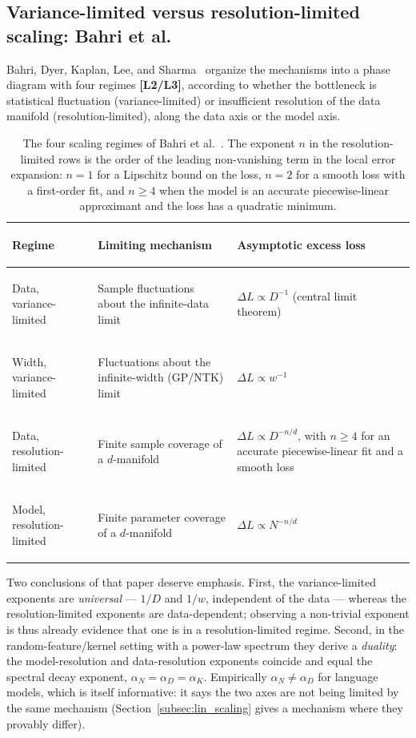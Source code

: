 \documentclass[11pt,a4paper]{article}
\theoremstyle{definition}
\begin{document}
\subsection{Variance-limited versus resolution-limited scaling: Bahri et al.}
\label{subsec:bahri_pnas}

Bahri, Dyer, Kaplan, Lee, and Sharma~\cite{bahri2024explaining} organize the mechanisms into a phase diagram with four regimes \textbf{[L2/L3]}, according to whether the bottleneck is statistical fluctuation (variance-limited) or insufficient resolution of the data manifold (resolution-limited), along the data axis or the model axis.

\begin{table}[htbp]
\centering
\small
\renewcommand{\arraystretch}{1.3}
\begin{tabularx}{\textwidth}{>{\bfseries\raggedright\arraybackslash}p{3.0cm} >{\raggedright\arraybackslash}p{4.4cm} >{\raggedright\arraybackslash}X}
\toprule
\textbf{Regime} & \textbf{Limiting mechanism} & \textbf{Asymptotic excess loss} \\
\midrule
Data, variance-limited & Sample fluctuations about the infinite-data limit & $\Delta L \propto D^{-1}$ (central limit theorem) \\
Width, variance-limited & Fluctuations about the infinite-width (GP/NTK) limit & $\Delta L \propto w^{-1}$ \\
Data, resolution-limited & Finite sample coverage of a $d$-manifold & $\Delta L \propto D^{-n/d}$, with $n \ge 4$ for an accurate piecewise-linear fit and a smooth loss \\
Model, resolution-limited & Finite parameter coverage of a $d$-manifold & $\Delta L \propto N^{-n/d}$ \\
\bottomrule
\end{tabularx}
\caption{The four scaling regimes of Bahri et al.~\cite{bahri2024explaining}. The exponent $n$ in the resolution-limited rows is the order of the leading non-vanishing term in the local error expansion: $n=1$ for a Lipschitz bound on the loss, $n=2$ for a smooth loss with a first-order fit, and $n\ge 4$ when the model is an accurate piecewise-linear approximant and the loss has a quadratic minimum.}
\label{tab:bahri_regimes}
\end{table}

Two conclusions of that paper deserve emphasis. First, the variance-limited exponents are \emph{universal} --- $1/D$ and $1/w$, independent of the data --- whereas the resolution-limited exponents are data-dependent; observing a non-trivial exponent is thus already evidence that one is in a resolution-limited regime. Second, in the random-feature/kernel setting with a power-law spectrum they derive a \emph{duality}: the model-resolution and data-resolution exponents coincide and equal the spectral decay exponent, $\alpha_N=\alpha_D=\alpha_K$. Empirically $\alpha_N\ne\alpha_D$ for language models, which is itself informative: it says the two axes are not being limited by the same mechanism (Section~\ref{subsec:lin_scaling} gives a mechanism where they provably differ).
\end{document}
